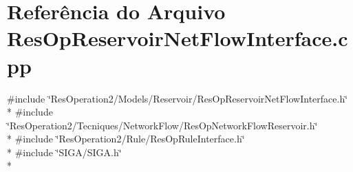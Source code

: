 \section{Referência do Arquivo Res\+Op\+Reservoir\+Net\+Flow\+Interface.\+cpp}
\label{_res_op_reservoir_net_flow_interface_8cpp}
{\ttfamily \#include \char`\"{}Res\+Operation2/\+Models/\+Reservoir/\+Res\+Op\+Reservoir\+Net\+Flow\+Interface.\+h\char`\"{}}\\*
{\ttfamily \#include \char`\"{}Res\+Operation2/\+Tecniques/\+Network\+Flow/\+Res\+Op\+Network\+Flow\+Reservoir.\+h\char`\"{}}\\*
{\ttfamily \#include \char`\"{}Res\+Operation2/\+Rule/\+Res\+Op\+Rule\+Interface.\+h\char`\"{}}\\*
{\ttfamily \#include \char`\"{}S\+I\+G\+A/\+S\+I\+G\+A.\+h\char`\"{}}\\*
